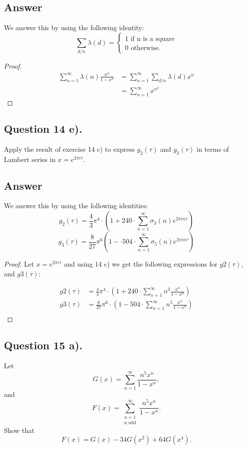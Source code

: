 \subsection*{Answer}
\noindent
We answer this by using the following identity:
\[
    \sum_{d/n}\lambda(d) =
    \begin{cases}
        1 \text{ if n is a square} \\
        0 \text{ otherwise. }
    \end{cases}
\]

\begin{proof}
    \begin{align*}
        \sum_{n=1}^{\infty}\lambda(n) \frac{x^n}{1-x^n} &= \sum_{n=1}^{\infty} \sum_{d/n} \lambda(d) x^n \\
        &= \sum_{n=1}^{\infty} x^{n^2}
    \end{align*}
\end{proof}


\subsection{Question 14 e).}
\noindent
Apply the result of exercise 14 c) to express $g_2(\tau)$ and $g_3(\tau)$ in terms of Lambert series in
$x=e^{2\pi i \tau}$.

\subsection*{Answer}
\noindent
We answer this by using the following identities:
\[
    {g_2(\tau)}=\frac{4}{3}\pi^4 \cdot (1 + 240 \cdot \sum_{n=1}^{\infty}\sigma_3(n)e^{2\pi i n \tau})
\]
\[
    {g_3(\tau)}=\frac{8}{27}\pi^6(1 - \cdot 504 \cdot \sum_{n=1}^{\infty}\sigma_5(n)e^{2\pi i n \tau})
\]

\begin{proof}
    Let $x=e^{2 \pi i \tau}$ and using 14 c) we get the following expressions for $g2(\tau)$, and $g3(\tau)$:

    \begin{align*}
        g2(\tau)&=\frac{4}{3}\pi^4 \cdot (1 + 240 \cdot \sum_{n=1}^{\infty}n^3 \frac{x^n}{1-x^n}) \\
        g3(\tau)&=\frac{8}{27}\pi^6 \cdot (1 - 504 \cdot \sum_{n=1}^{\infty}n^5 \frac{x^n}{1-x^n}) \\
    \end{align*}

\end{proof}


\subsection{Question 15 a).}
\noindent
Let
\[
    G(x)=\sum_{n=1}^{\infty} \frac{n^5 x^n}{1-x^n},
\]
and
\[
    F(x)=\sum_{\substack{n=1\\ \text{n odd}}}^{\infty} \frac{n^5 x^n}{1-x^n}.
\]
Show that
\[
    F(x)=G(x)-34G(x^2)+64G(x^4).
\]

